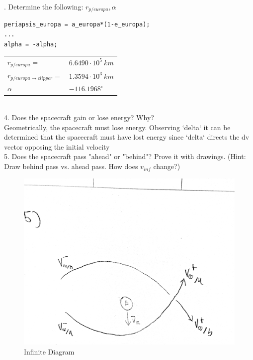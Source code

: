 \documentclass[hidelinks,12pt]{article}
\begin{document}
\vspace{10px}
. Determine the following: $r_{p/europa}, \alpha$\\
\begin{lstlisting}[frame=lines,style=Matlab-editor,basicstyle = \mlttfamily]
periapsis_europa = a_europa*(1-e_europa);
...
alpha = -alpha;
\end{lstlisting}
\begin{tabular}{ll}
$r_{p/europa}=$&$6.6490 \cdot 10^5~km$\\
$r_{p/europa \rightarrow clipper}=$&$1.3594 \cdot 10^3~km$\\
$\alpha=$&$-116.1968^\circ$\\
\end{tabular}\\
\vspace{10px}
4. Does the spacecraft gain or lose energy? Why?\\
Geometrically, the spacecraft must lose energy. Observing `delta` it can be determined that the spacecraft must have lost energy since `delta` directs the dv vector opposing the initial velocity\\
\vspace{10px}
5. Does the spacecraft pass "ahead" or "behind"? Prove it with drawings. (Hint: Draw behind pass vs. ahead pass. How does $v_{inf}$ change?)\\
\begin{figure}[!htb]
  \center
  \includegraphics[scale=0.1]{5}
  \caption{Infinite Diagram}
  \label{fig:Fig02}
\end{figure}
\vspace{10px}
\end{document}
